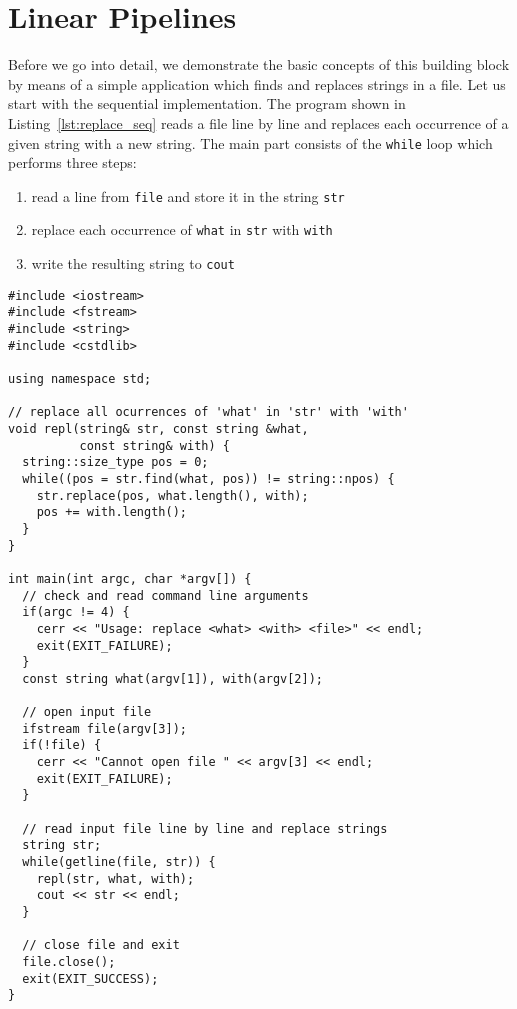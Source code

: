 \section{Linear Pipelines}

Before we go into detail, we demonstrate the basic concepts of this building block by means of a simple application which finds and replaces strings in a file. Let us start with the sequential implementation. The program shown in Listing~\ref{lst:replace_seq} reads a file line by line and replaces each occurrence of a given string with a new string. The main part consists of the \lstinline|while| loop which performs three steps:

\begin{enumerate}\setlength{\itemsep}{0pt}
 \item read a line from \lstinline|file| and store it in the string \lstinline|str|
 \item replace each occurrence of \lstinline|what| in \lstinline|str| with \lstinline|with|
 \item write the resulting string to \lstinline|cout|
\end{enumerate}

\begin{lstlisting}[float,caption={Sequential program for replacing strings in a file},label={lst:replace_seq}]
#include <iostream>
#include <fstream>
#include <string>
#include <cstdlib>

using namespace std;

// replace all ocurrences of 'what' in 'str' with 'with'
void repl(string& str, const string &what,
          const string& with) {
  string::size_type pos = 0;
  while((pos = str.find(what, pos)) != string::npos) {
    str.replace(pos, what.length(), with);
    pos += with.length();
  }
}

int main(int argc, char *argv[]) {
  // check and read command line arguments
  if(argc != 4) {
    cerr << "Usage: replace <what> <with> <file>" << endl;
    exit(EXIT_FAILURE);
  }
  const string what(argv[1]), with(argv[2]);

  // open input file
  ifstream file(argv[3]);
  if(!file) {
    cerr << "Cannot open file " << argv[3] << endl;
    exit(EXIT_FAILURE);
  }

  // read input file line by line and replace strings
  string str;
  while(getline(file, str)) {
    repl(str, what, with);
    cout << str << endl;
  }

  // close file and exit
  file.close();
  exit(EXIT_SUCCESS);
}
\end{lstlisting}

